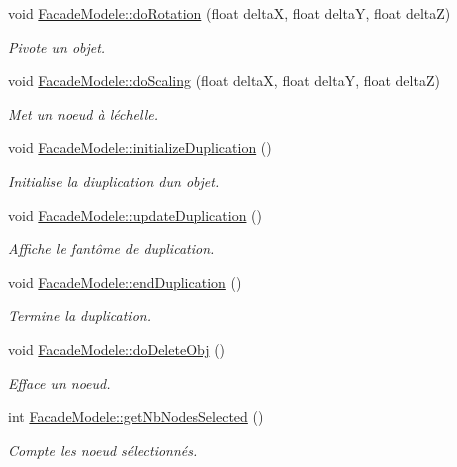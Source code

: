 \begin{DoxyCompactItemize}
void \hyperlink{group__inf2990_ga51bb0f8d8e9a6c421ca688e83e10d670}{Facade\+Modele\+::do\+Rotation} (float delta\+X, float delta\+Y, float delta\+Z)
\begin{DoxyCompactList}\small\item\em Pivote un objet. \end{DoxyCompactList}\item 
void \hyperlink{group__inf2990_gac8decb6e4a3eabfa6baa89022aaab8eb}{Facade\+Modele\+::do\+Scaling} (float delta\+X, float delta\+Y, float delta\+Z)
\begin{DoxyCompactList}\small\item\em Met un noeud à l\textquotesingle{}échelle. \end{DoxyCompactList}\item 
void \hyperlink{group__inf2990_ga6f50ec221ffc9a37a80fc87b9241000e}{Facade\+Modele\+::initialize\+Duplication} ()
\begin{DoxyCompactList}\small\item\em Initialise la diuplication d\textquotesingle{}un objet. \end{DoxyCompactList}\item 
void \hyperlink{group__inf2990_ga1a3e0ca25ffb4442968ce0977ca37d45}{Facade\+Modele\+::update\+Duplication} ()
\begin{DoxyCompactList}\small\item\em Affiche le fantôme de duplication. \end{DoxyCompactList}\item 
void \hyperlink{group__inf2990_ga236c0dba051c913078932ea1cf4a2e76}{Facade\+Modele\+::end\+Duplication} ()
\begin{DoxyCompactList}\small\item\em Termine la duplication. \end{DoxyCompactList}\item 
void \hyperlink{group__inf2990_gaa41bbec7d5381099ca3b945b6ed2675f}{Facade\+Modele\+::do\+Delete\+Obj} ()
\begin{DoxyCompactList}\small\item\em Efface un noeud. \end{DoxyCompactList}\item 
int \hyperlink{group__inf2990_gac85e226dae7761e7e98e0df151c5a766}{Facade\+Modele\+::get\+Nb\+Nodes\+Selected} ()
\begin{DoxyCompactList}\small\item\em Compte les noeud sélectionnés. \end{DoxyCompactList}\item 

\end{DoxyCompactItemize}
